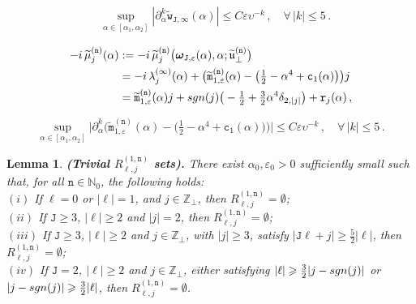 \documentclass[10pt,a4paper]{amsart}
\newtheorem{lem}{Lemma}
\newcommand{\Z}{{\mathbb Z}}
\newcommand{\bomega}{{\boldsymbol{\omega}}}
\newcommand{\fu}{{\mathfrak{u}}}
\newcommand{\im}{{\rm i}}
\newcommand{\pa}{\partial}
\newcommand{\tJ}{{\mathtt J}}
\newcommand{\tc}{{\mathtt c}}
\newcommand{\tm}{{\mathtt m}}
\newcommand{\tn}{{\mathtt n}}
\newcommand{\tr}{{\mathtt r}}
\newcommand{\tw}{{\mathtt w}}
\newcommand{\wt}[1]{{\widetilde{#1}}}
\begin{document}
	\begin{align}
		&\sup_{\alpha\in[\alpha_{1},\alpha_{2}]}|\pa_{\alpha}^{k}\wt\tw_{\tJ,\infty}(\alpha)| \leq C \varepsilon \upsilon^{-k} \,, \quad \forall \, |k|\leq 5 \,.\label{ME.2} 
	\end{align}

    \begin{align}
			-\im \, \wt\mu_{j}^{(\tn)}(\alpha)&:= -\im\,\wt\mu_{j}^{(\tn)}\big(\bomega_{\tJ,\varepsilon}(\alpha),\alpha; \wt\fu_{\perp}^{(\tn)}\big)\\
			& = {- \im\,  \lambda_{j}^{(\infty)}(\alpha)  + \big(  \wt\tm_{1,\varepsilon}^{(\tn)}(\alpha)}-\big( \tfrac12 - \alpha^4 + \tc_{1}(\alpha) \big) \big)j \\
			& =   \wt\tm_{1,\varepsilon}^{(\tn)}(\alpha)j +{\rm sgn}(j)\big(- \tfrac12  + \tfrac32 \alpha^4 \delta_{2,|j|} \big)+ \tr_{j}(\alpha) \,, \label{ME.1.1}
		\end{align}

\begin{equation}\label{diff-Hm}
 \sup_{\alpha\in[\alpha_{1},\alpha_{2}]}\big|\pa_{\alpha}^{k} \big(\wt\tm_{1,\varepsilon}^{(\tn)}(\alpha) -\big(\tfrac12 - \alpha^4 + \tc_{1}(\alpha) \big) \big)\big| \leq C \varepsilon \upsilon^{-k} \,,  \quad \forall\, |k|\leq 5 \,.   
\end{equation}

\begin{lem}\label{lemma.empty.n}
{\bf (Trivial $R_{\ell,j}^{(1,\tn)}$ sets).}
    There exist $\alpha_{0}, \varepsilon_{0} > 0$ sufficiently small such that, for all $\tn \in \mathbb{N}_0$, the following holds:
    \\[1mm]
    \noindent $(i)$ If $\ell=0$ or $|\ell|=1$, and $j\in\Z_{\perp}$, then $R_{\ell,j}^{(1,\tn)}=\emptyset$;
    \\[1mm]
    \noindent $(ii)$  If $\tJ\geq 3$, $|\ell|\geq 2$ and $|j|=2$, then $R_{\ell,j}^{(1,\tn)}=\emptyset$;
    \\[1mm]
    \noindent $(iii)$ If $\tJ\geq 3$, $|\ell|\geq 2$ and $j\in\Z_{\perp}$, with $|j|\geq 3$,  satisfy $|\tJ \ell + j| \geq \tfrac52 |\ell|$, then $R_{\ell,j}^{(1,\tn)}=\emptyset$;
    \\[1mm]
    \noindent $(iv)$  If $\tJ=2$, $|\ell|\geqslant 2$  and $j\in \Z_{\perp} $, either satisfying $|\ell|\geqslant \tfrac32|j-{\rm sgn}(j)|$ or  $ |j-{\rm sgn}(j)|\geqslant \tfrac32|\ell|$, then $R_{\ell,j}^{(1,\tn)}=\emptyset$.
\end{lem}
\end{document}
